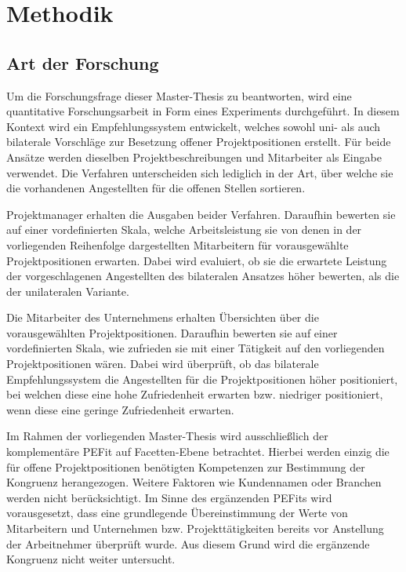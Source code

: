 \chapter{Methodik}
\label{ch:methodik}

\section{Art der Forschung}
\label{ch:methodik:art}
Um die Forschungsfrage dieser Master-Thesis zu beantworten, wird eine quantitative Forschungsarbeit in Form eines Experiments durchgeführt. In diesem Kontext wird ein Empfehlungssystem entwickelt, welches sowohl uni- als auch bilaterale Vorschläge zur Besetzung offener Projektpositionen erstellt. Für beide Ansätze werden dieselben Projektbeschreibungen und Mitarbeiter als Eingabe verwendet. Die Verfahren unterscheiden sich lediglich in der Art, über welche sie die vorhandenen Angestellten für die offenen Stellen sortieren.

Projektmanager erhalten die Ausgaben beider Verfahren. Daraufhin bewerten sie auf einer vordefinierten Skala, welche Arbeitsleistung sie von denen in der vorliegenden Reihenfolge dargestellten Mitarbeitern für vorausgewählte Projektpositionen erwarten. Dabei wird evaluiert, ob sie die erwartete Leistung der vorgeschlagenen Angestellten des bilateralen Ansatzes höher bewerten, als die der unilateralen Variante.

Die Mitarbeiter des Unternehmens erhalten Übersichten über die vorausgewählten Projektpositionen. Daraufhin bewerten sie auf einer vordefinierten Skala, wie zufrieden sie mit einer Tätigkeit auf den vorliegenden Projektpositionen wären. Dabei wird überprüft, ob das bilaterale Empfehlungssystem die Angestellten für die Projektpositionen höher positioniert, bei welchen diese eine hohe Zufriedenheit erwarten bzw. niedriger positioniert, wenn diese eine geringe Zufriedenheit erwarten.

Im Rahmen der vorliegenden Master-Thesis wird ausschließlich der komplementäre \ac{PEFit} auf Facetten-Ebene betrachtet. Hierbei werden einzig die für offene Projektpositionen benötigten Kompetenzen zur Bestimmung der Kongruenz herangezogen. Weitere Faktoren wie Kundennamen oder Branchen werden nicht berücksichtigt. Im Sinne des ergänzenden \acp{PEFit} wird vorausgesetzt, dass eine grundlegende Übereinstimmung der Werte von Mitarbeitern und Unternehmen bzw. Projekttätigkeiten bereits vor Anstellung der Arbeitnehmer überprüft wurde. Aus diesem Grund wird die ergänzende Kongruenz nicht weiter untersucht.

